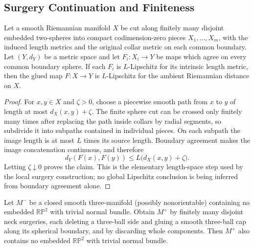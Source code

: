 \subsection{Surgery Continuation and Finiteness}

\begin{lemma}
\label{lem:length-metric-gluing}
\notready
Let a smooth Riemannian manifold $X$ be cut along finitely many disjoint
embedded two-spheres into compact codimension-zero pieces $X_1,\ldots,X_m$,
with the induced length metrics and the original collar metric on each common
boundary.  Let $(Y,d_Y)$ be a metric space and let
$F_i\colon X_i\to Y$ be maps which agree on every common boundary sphere.
If each $F_i$ is $L$-Lipschitz for its intrinsic length metric, then the
glued map $F\colon X\to Y$ is $L$-Lipschitz for the ambient Riemannian
distance on $X$.
\end{lemma}

\begin{proof}
For $x,y\in X$ and $\zeta>0$, choose a piecewise smooth path from $x$ to
$y$ of length at most $d_X(x,y)+\zeta$.  The finite sphere cut can be
crossed only finitely many times after replacing the path inside collars by
radial segments, so subdivide it into subpaths contained in individual
pieces.  On each subpath the image length is at most $L$ times its source
length.  Boundary agreement makes the image concatenation continuous, and
therefore
\[
 d_Y(F(x),F(y))\le L\bigl(d_X(x,y)+\zeta\bigr).
\]
Letting $\zeta\downarrow0$ proves the claim.  This is the elementary
length-space step used by the local surgery construction; no global
Lipschitz conclusion is being inferred from boundary agreement alone.
\end{proof}

\begin{lemma}
\label{lem:rp2-exclusion-under-ball-surgery}
\notready
Let $M^-$ be a closed smooth three-manifold (possibly nonorientable)
containing no embedded $\mathbb{RP}^2$ with trivial normal bundle.  Obtain
$M^+$ by finitely many
disjoint neck surgeries, each deleting a three-ball side and gluing a smooth
three-ball cap along its spherical boundary, and by discarding whole
components.  Then $M^+$ also contains no embedded $\mathbb{RP}^2$ with trivial
normal bundle.
\end{lemma}

